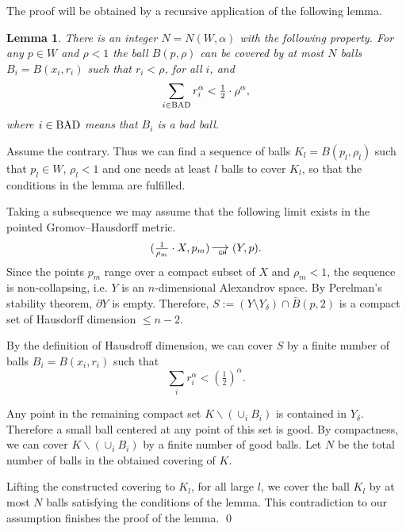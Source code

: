 \documentclass[12pt,leqno,intlimits]{amsart}
\numberwithin{equation}{section}
\newtheorem{lem}[thm]{Lemma}
\theoremstyle{definition}
\theoremstyle{remark}
\def\BAD{\mathop{\rm BAD}\nolimits}%
\newcommand*{\GHto}{\mathbin{\begin{picture}(16,3.5)
\put(-1,1){$\longrightarrow$}
\put(13,-3){\llap{\text{\sf\tiny GH}}}
\end{picture}}}
\def\parit#1{\medskip\noindent{\it #1}}
\def\qeds{\qed\par\medskip}
\begin{document}
The proof will be obtained by a recursive application of the following lemma.

\begin{lem}\label{lem:covering}
There is an integer $N =N(W,\alpha) $ with the following property. For any $p\in W$ and $\rho < 1$
the ball $B(p,{\rho})$ can be covered by at most $N$ balls
$B_i=B(x_i,{r_i})$ such that $r_i <\rho$, for all $i$, and
$$ \sum_{i\in \BAD}r_i^{\alpha}< \tfrac12\cdot \rho^{\alpha}  ,$$
where $i\in \BAD$ means that $B_i$ is a bad ball.
\end{lem}

\parit{Proof.}
Assume the contrary. Thus we can find a sequence of balls
$K_l=B(p_l,\rho_l)$
such that $p_l\in W$,
$\rho_l<1$ and
one needs at least $l$ balls to cover $K_l$, so that the conditions in the lemma are fulfilled.

Taking a subsequence we may assume that the following limit exists in the pointed Gromov--Hausdorff metric.
$$(\tfrac1{\rho_m}\cdot X,p_m)\GHto (Y,p).$$
Since the points $p_m$ range over a compact subset of $X$ and $\rho _m <1$, the
sequence is non-collapsing, i.e. $Y$ is an $n$-dimensional Alexandrov space.
By Perelman's stability theorem, $\partial Y$ is empty.
Therefore, $S:= (Y\setminus Y_{\delta} ) \cap \bar B (p,2)$ is a compact set of Hausdorff dimension $\le n-2$.

By the definition of Hausdroff dimension, we can cover $S$ by a finite number of balls
$B_i=B(x_i,{r_i})$ such that
$$\sum_ir_i^{\alpha} < (\tfrac12)^{\alpha}.$$

Any point in the remaining compact set $K\backslash (\cup_i B_i)$
is contained in $Y_{\delta}$. Therefore a small ball centered at any point of this set is good.
By compactness, we can cover $K\backslash (\cup_i B_i)$ by a finite number of good balls.
Let $N$ be the total number of balls in the obtained covering of $K$.

Lifting the constructed covering to $K_l$, for all large $l$,
we cover
the ball $K_l$ by at most $N$ balls satisfying the conditions of the lemma.
This contradiction to our assumption finishes the proof of the lemma.
\qeds
\end{document}
